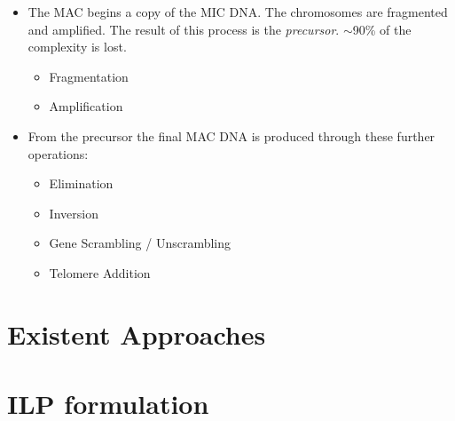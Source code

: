 \begin{itemize}
	\item The MAC begins a copy of the MIC DNA. The chromosomes are fragmented and amplified. The result of this process is the \textit{precursor}. $\sim$90\% of the complexity is lost.
	\begin{itemize}
    	\item Fragmentation
    	\item Amplification
    \end{itemize}

	\item From the precursor the final MAC DNA is produced through these further operations:
	\begin{itemize}
    	\item Elimination
    	\item Inversion
    	\item Gene Scrambling / Unscrambling
    	\item Telomere Addition
    \end{itemize}

\end{itemize}

\section{Existent Approaches}

\section{ILP formulation}
